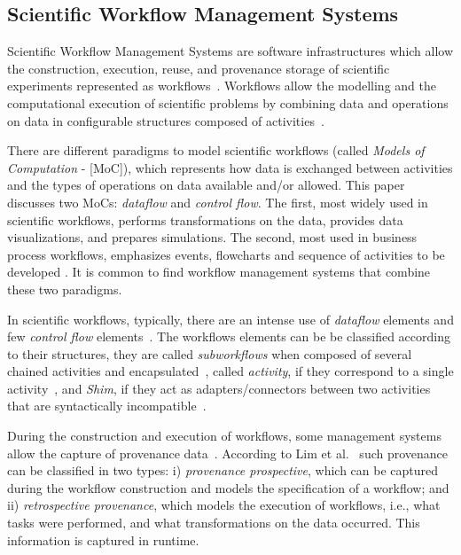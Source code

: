 \documentclass{sig-alternate-05-2015}
\begin{document}
\subsection{Scientific Workflow Management Systems}\label{SISTEMASGERENCIADORESWORKFLOWCIENTIFICO}
Scientific Workflow Management Systems are software infrastructures which allow the construction, execution, reuse, and provenance storage of scientific experiments represented as workflows~\cite{McPhillips2009}. Workflows allow the modelling and the computational execution of scientific problems by combining data and operations on data in configurable structures composed of activities~\cite{Garijo2014}.

There are different paradigms to model scientific workflows (called \emph{Models of Computation} - [MoC]), which represents how data is exchanged between activities and the types of operations on data available and/or allowed. This paper discusses two MoCs: \emph{dataflow} and \emph{control flow}. The first, most widely used in scientific workflows, performs transformations on the data, provides data visualizations, and prepares simulations. The second, most used in business process workflows, emphasizes events, flowcharts and sequence of activities to be developed \cite{Ludascher2006}. It is common to find workflow management systems that combine these two paradigms.

In scientific workflows, typically, there are an intense use of \emph{dataflow} elements and few \emph{control flow} elements~\cite{Ludascher2006}. The workflows elements can be be classified according to their structures, they are called \emph{subworkflows} when composed of several chained activities and encapsulated~\cite{medeiros_woodss_2005}, called \emph{activity}, if they correspond to a single activity~\cite{Garijo2012}, and \emph{Shim}, if they act as adapters/connectors between two activities that are syntactically incompatible~\cite{Lin2009}.

During the construction and execution of workflows, some management systems allow the capture of provenance data~\cite{ Zeng2011}. According to Lim et al.~\cite{Lim2010} such provenance can be classified in two types: i) \emph{provenance prospective}, which can be captured during the workflow construction and models the specification of a workflow; and ii) \emph{retrospective provenance}, which models the execution of workflows, i.e., what tasks were performed, and what transformations on the data occurred. This information is captured in runtime.
\end{document}
